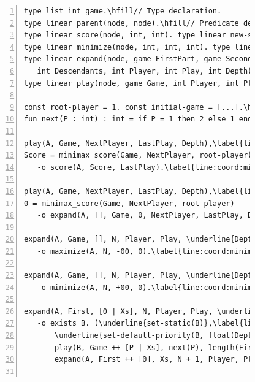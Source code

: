 \begin{figure}[ht]
\begin{Verbatim}[numbers=left,commandchars=\\\{\},fontsize=\tiny]
type list int game.\hfill// Type declaration.
type linear parent(node, node).\hfill// Predicate declaration.
type linear score(node, int, int). type linear new-score(node, int, int).
type linear minimize(node, int, int, int). type linear maximize(node, int, int, int).
type linear expand(node, game FirstPart, game SecondPart,
   int Descendants, int Player, int Play, int Depth).
type linear play(node, game Game, int Player, int Play, int Depth).

const root-player = 1. const initial-game = [...].\hfill// Constant declaration: player and initial game state.
fun next(P : int) : int = if P = 1 then 2 else 1 end.\hfill// Function declaration: select next player.

play(A, Game, NextPlayer, LastPlay, Depth),\label{line:coord:minimax_play1}\label{line:coord:minimax_play11}\hfill// Rule 1: ending game state.
Score = minimax_score(Game, NextPlayer, root-player), Score > 0
   -o score(A, Score, LastPlay).\label{line:coord:minimax_play12}

play(A, Game, NextPlayer, LastPlay, Depth),\label{line:coord:minimax_play21}\hfill// Rule 2: expand state.
0 = minimax_score(Game, NextPlayer, root-player)
   -o expand(A, [], Game, 0, NextPlayer, LastPlay, Depth).\label{line:coord:minimax_play2}\label{line:coord:minimax_play22}

expand(A, Game, [], N, Player, Play, \underline{Depth}), Player = root-player\label{line:coord:minimax_expand1}\label{line:coord:minimax_rule11}\hfill// Rule 3: maximize node.
   -o maximize(A, N, -00, 0).\label{line:coord:minimax_rule12}

expand(A, Game, [], N, Player, Play, \underline{Depth}), Player <> root-player\label{line:coord:minimax_rule21}\hfill// Rule 4: minimize node.
   -o minimize(A, N, +00, 0).\label{line:coord:minimax_rule22}

expand(A, First, [0 | Xs], N, Player, Play, \underline{Depth}), Depth >= 5\label{line:coord:minimax_rule31}\hfill// Rule 5: create static child node.
   -o exists B. (\underline{set-static(B)},\label{line:coord:minimax_coord1}
       \underline{set-default-priority(B, float(Depth + 1))},\label{line:coord:minimax_coord2}
       play(B, Game ++ [P | Xs], next(P), length(First), \underline{Depth + 1}), parent(B, A).
       expand(A, First ++ [0], Xs, N + 1, Player, Play, \underline{Depth})).\label{line:coord:minimax_rule32}


\end{Verbatim}
\end{figure}
